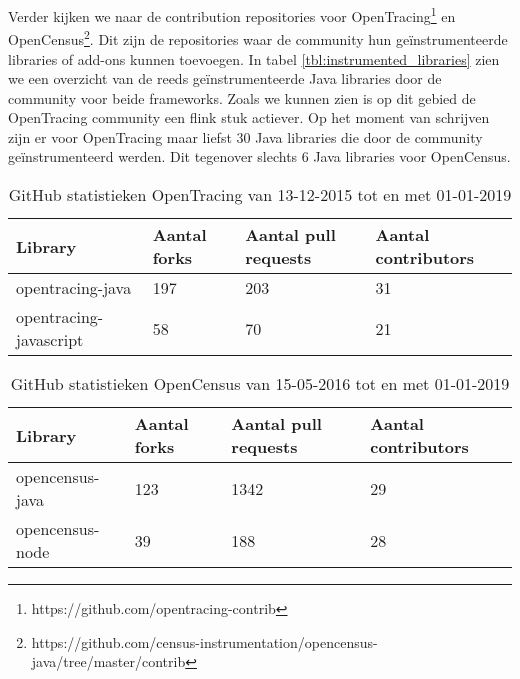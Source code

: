 Verder kijken we naar de contribution repositories voor OpenTracing\footnote{https://github.com/opentracing-contrib} en OpenCensus\footnote{https://github.com/census-instrumentation/opencensus-java/tree/master/contrib}. Dit zijn de repositories waar de community hun geïnstrumenteerde libraries of add-ons kunnen toevoegen. In tabel \ref{tbl:instrumented_libraries} zien we een overzicht van de reeds geïnstrumenteerde Java libraries door de community voor beide frameworks. Zoals we kunnen zien is op dit gebied de OpenTracing community een flink stuk actiever. Op het moment van schrijven zijn er voor OpenTracing maar liefst 30 Java libraries die door de community geïnstrumenteerd werden. Dit tegenover slechts 6 Java libraries voor OpenCensus.
\begin{table}
	\caption{GitHub statistieken OpenTracing van 13-12-2015 tot en met 01-01-2019}
	\label{tbl:opentracingcontrib}
	\begin{center}
		\begin{tabular}{| p{5cm} | l | l | l |}
			\hline
			Library & Aantal forks & Aantal pull requests & Aantal contributors \\ \hline
			opentracing-java & 197 & 203 & 31 \\ \hline
			opentracing-javascript & 58 & 70 & 21 \\ \hline
		\end{tabular}
	\end{center}
\end{table}
\begin{table}
	\caption{GitHub statistieken OpenCensus van 15-05-2016 tot en met 01-01-2019}
	\label{tbl:opencensuscontrib}
	\begin{center}
		\begin{tabular}{| p{5cm} | l | l | l |}
			\hline
			Library & Aantal forks & Aantal pull requests & Aantal contributors \\ \hline
			opencensus-java & 123 & 1342 & 29 \\ \hline
			opencensus-node & 39 & 188 & 28 \\ \hline
		\end{tabular}
	\end{center}
	
\end{table}
